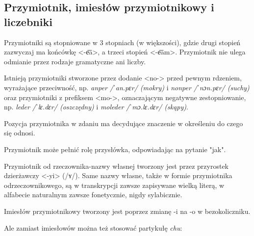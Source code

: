 \subsection{Przymiotnik, imiesłów przymiotnikowy i liczebniki}

Przymiotniki są stopniowane w 3 stopniach (w większości), gdzie drugi stopień 
zazwyczaj ma końcówkę <-e͞a>, a trzeci stopień <-e͞am>. Przymiotnik nie ulega 
odmianie przez rodzaje gramatyczne ani liczby.

Istnieją przymiotniki stworzone przez dodanie <no-> przed pewnym rdzeniem, 
wyrażające przeciwność, np. \emph{anper /ˈan.pɛr/ (mokry)} i \emph{nonper 
/ˈnɔn.pɛr/ (suchy)} oraz przymiotniki z prefiksem <mo->, oznaczającym negatywne 
zestopniowanie, np. \emph{leder /ˈlɛ.dɛr/ (oszczędny)} i \emph{moleder 
/ˈmɔ.lɛ.dɛr/ (skąpy)}.

Pozycja przymiotnika w zdaniu ma decydujące znaczenie w określeniu do czego się 
odnosi.





Przymiotnik może pełnić rolę przysłówka, odpowiadając na pytanie "jak".


Przymiotnik od rzeczownika-nazwy własnej tworzony jest przez przyrostek 
dzierżawczy <-yi> (/ʏ/). Same nazwy własne, także w formie przymiotnika 
odrzeczownikowego, są w transkrypcji zawsze zapisywane wielką literą, w 
alfabecie naturalnym zawsze fonetycznie, nigdy sylabicznie.

Imiesłów przymiotnikowy tworzony jest poprzez zmianę -i na -o w bezokoliczniku.


Ale zamiast imiesłowów można też stosować partykułę \emph{chu}:



